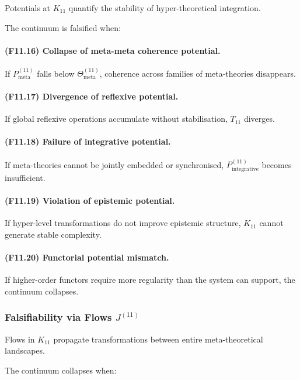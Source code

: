 Potentials at $K_{11}$ quantify the stability of
hyper-theoretical integration.

The continuum is falsified when:

\paragraph{(F11.16) Collapse of meta-meta coherence potential.}
If $P_{\mathrm{meta}}^{(11)}$ falls below $\Theta_{\mathrm{meta}}^{(11)}$,
coherence across families of meta-theories disappears.

\paragraph{(F11.17) Divergence of reflexive potential.}
If global reflexive operations accumulate without stabilisation,
$T_{11}$ diverges.

\paragraph{(F11.18) Failure of integrative potential.}
If meta-theories cannot be jointly embedded or synchronised,
$P_{\mathrm{integrative}}^{(11)}$ becomes insufficient.

\paragraph{(F11.19) Violation of epistemic potential.}
If hyper-level transformations do not improve epistemic structure,
$K_{11}$ cannot generate stable complexity.

\paragraph{(F11.20) Functorial potential mismatch.}
If higher-order functors require more regularity than the system can support,
the continuum collapses.



\subsubsection{Falsifiability via Flows $J^{(11)}$}

Flows in $K_{11}$ propagate transformations
between entire meta-theoretical landscapes.

The continuum collapses when:

